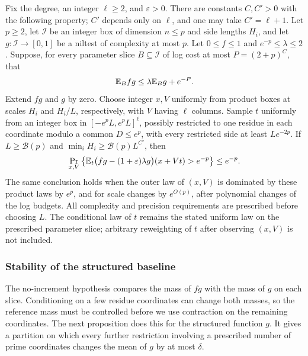 \begin{proposition}
\label{sampling:scalar-transfer}
Fix the degree, an integer $\ell\ge2$, and $\varepsilon>0$.  There are
constants $C,C'>0$ with the following property;
$C'$ depends only on $\ell$, and one may take $C'=\ell+1$.
Let $p\ge2$, let $\mathcal I$ be an integer box of dimension $n\le p$ and
side lengths $H_i$, and let $g:\mathcal I\to[0,1]$ be a niltest of
complexity at most $p$.  Let $0\le f\le1$ and $e^{-p}\le\lambda\le2$.
Suppose, for every parameter slice $B\subseteq\mathcal I$ of log cost
at most $P=(2+p)^C$, that
\begin{equation}\label{sampling:no-increment}
 \mathbb E_B fg\le\lambda\mathbb E_Bg+e^{-P}.
\end{equation}
Extend $fg$ and $g$ by zero.  Choose integer $x,V$ uniformly from product
boxes at scales $H_i$ and $H_i/L$, respectively, with $V$ having $\ell$
columns.  Sample $t$ uniformly from an integer box in
$[-e^pL,e^pL]^\ell$, possibly restricted to one residue in each coordinate
modulo a common $D\le e^p$, with every restricted side at least $Le^{-2p}$.
If $L\ge\mathcal B(p)$ and $\min_iH_i\ge\mathcal B(p)L^{C'}$, then
\begin{equation}\label{sampling:scalar-conclusion}
 \Pr_{x,V}\left\{
 \mathbb E_t\bigl(fg-(1+\varepsilon)\lambda g\bigr)(x+Vt)>e^{-p}
 \right\}\le e^{-p}.
\end{equation}
The same conclusion holds when the outer law of $(x,V)$ is dominated by
these product laws by $e^p$, and for scale changes by $e^{O(p)}$, after polynomial changes
of the log budgets.  All complexity and precision requirements are prescribed
before choosing $L$.  The conditional law of $t$ remains the stated uniform
law on the prescribed parameter slice; arbitrary reweighting of $t$ after
observing $(x,V)$ is not included.
\end{proposition}

\subsubsection{Stability of the structured baseline}

The no-increment hypothesis compares the mass of $fg$ with the mass
of $g$ on each slice.  Conditioning on a few residue coordinates can
change both masses, so the reference mass must be controlled before
we use contraction on the remaining coordinates.  The next proposition
does this for the structured function $g$.  It gives a partition on
which every further restriction involving a prescribed number of
prime coordinates changes the mean of $g$ by at most $\delta$.

